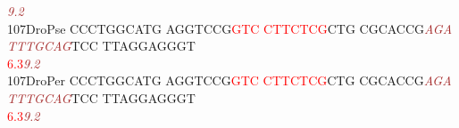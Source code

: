 \documentclass[11pt,twoside,reqno,a4paper]{article}
\begin{document}
{\hspace*{4\charwidth}\hspace*{7\charwidth}\hspace*{1\charwidth}\hspace*{1\charwidth}\hspace*{1\charwidth}\hspace*{37\charwidth}\textit{\textcolor{Brown}{9.2}}\hspace*{1\charwidth}\hspace*{1\charwidth}\hspace*{1\charwidth}\\
107\hspace*{1\charwidth}DroPse	CCCTGGCATG	AGGTCCG\textcolor{Red}{G}\textcolor{Red}{T}\textcolor{Red}{C}	\textcolor{Red}{C}\textcolor{Red}{T}\textcolor{Red}{T}\textcolor{Red}{C}\textcolor{Red}{T}\textcolor{Red}{C}\textcolor{Red}{G}CTG	CGCACCG\textit{\textcolor{Brown}{A}}\textit{\textcolor{Brown}{G}}\textit{\textcolor{Brown}{A}}	\textit{\textcolor{Brown}{T}}\textit{\textcolor{Brown}{T}}\textit{\textcolor{Brown}{T}}\textit{\textcolor{Brown}{G}}\textit{\textcolor{Brown}{C}}\textit{\textcolor{Brown}{A}}\textit{\textcolor{Brown}{G}}TCC	TTAGGAGGGT	\\
\hspace*{4\charwidth}\hspace*{7\charwidth}\hspace*{1\charwidth}\hspace*{17\charwidth}\textcolor{Red}{6.3}\hspace*{1\charwidth}\hspace*{1\charwidth}\hspace*{17\charwidth}\textit{\textcolor{Brown}{9.2}}\hspace*{1\charwidth}\hspace*{1\charwidth}\hspace*{1\charwidth}\\
107\hspace*{1\charwidth}DroPer	CCCTGGCATG	AGGTCCG\textcolor{Red}{G}\textcolor{Red}{T}\textcolor{Red}{C}	\textcolor{Red}{C}\textcolor{Red}{T}\textcolor{Red}{T}\textcolor{Red}{C}\textcolor{Red}{T}\textcolor{Red}{C}\textcolor{Red}{G}CTG	CGCACCG\textit{\textcolor{Brown}{A}}\textit{\textcolor{Brown}{G}}\textit{\textcolor{Brown}{A}}	\textit{\textcolor{Brown}{T}}\textit{\textcolor{Brown}{T}}\textit{\textcolor{Brown}{T}}\textit{\textcolor{Brown}{G}}\textit{\textcolor{Brown}{C}}\textit{\textcolor{Brown}{A}}\textit{\textcolor{Brown}{G}}TCC	TTAGGAGGGT	\\
\hspace*{4\charwidth}\hspace*{7\charwidth}\hspace*{1\charwidth}\hspace*{17\charwidth}\textcolor{Red}{6.3}\hspace*{1\charwidth}\hspace*{1\charwidth}\hspace*{17\charwidth}\textit{\textcolor{Brown}{9.2}}\hspace*{1\charwidth}\hspace*{1\charwidth}\hspace*{1\charwidth}\\
}
\end{document}

